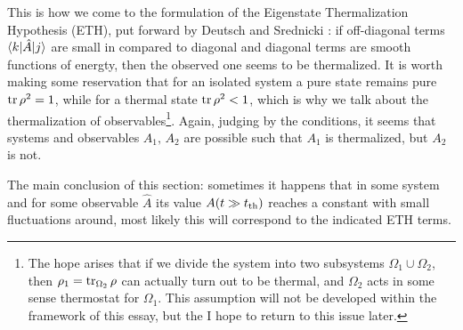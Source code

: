 This is how we come to the formulation of the Eigenstate Thermalization Hypothesis (ETH), put forward by Deutsch \cite{PhysRevA.43.2046} and Srednicki \cite{PhysRevE.50.888}: if off-diagonal terms $\bk{k}[\hat{A} ]{j}$ are small in compared to diagonal and diagonal terms are smooth functions of energty, then the observed one seems to be thermalized. It is worth making some reservation that for an isolated system a pure state remains pure $\mathop{\mathrm{tr}}\nolimits \rho^2 = 1$, while for a thermal state $\mathop{\mathrm{tr}}\nolimits \rho^2 < 1$, which is why we talk about the thermalization of observables\footnote{
	The hope arises that if we divide the system into two subsystems $\Omega_1 \cup \Omega_2$, then $\rho_1 = \mathop{\mathrm{tr}}\nolimits_{\Omega_2} \rho$ can actually turn out to be thermal, and $\Omega_2$ acts in some sense thermostat for $\Omega_1$. This assumption will not be developed within the framework of this essay, but the I hope to return to this issue later.
}. Again, judging by the conditions, it seems that systems and observables $A_1,\, A_2$ are possible such that $A_1$ is thermalized, but $A_2$ is not.

The main conclusion of this section: sometimes it happens that in some system and for some observable $\hat{A}$ its value $A(t \gg t_{\textnormal{th}})$ reaches a constant with small fluctuations around, most likely this will correspond to the indicated ETH terms.